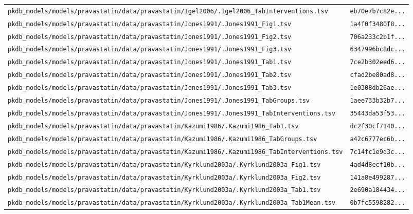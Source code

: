 \documentclass{article}
\begin{document}
\begin{longtable}{ll}
\texttt{pkdb\_models/models/pravastatin/data/pravastatin/Igel2006/.Igel2006\_TabInterventions.tsv} & \texttt{eb70e7b7c82e...} \\
\texttt{pkdb\_models/models/pravastatin/data/pravastatin/Jones1991/.Jones1991\_Fig1.tsv} & \texttt{1a4f0f3480f8...} \\
\texttt{pkdb\_models/models/pravastatin/data/pravastatin/Jones1991/.Jones1991\_Fig2.tsv} & \texttt{706a233c2b1f...} \\
\texttt{pkdb\_models/models/pravastatin/data/pravastatin/Jones1991/.Jones1991\_Fig3.tsv} & \texttt{6347996bc8dc...} \\
\texttt{pkdb\_models/models/pravastatin/data/pravastatin/Jones1991/.Jones1991\_Tab1.tsv} & \texttt{7ce2b302eed6...} \\
\texttt{pkdb\_models/models/pravastatin/data/pravastatin/Jones1991/.Jones1991\_Tab2.tsv} & \texttt{cfad2be80ad8...} \\
\texttt{pkdb\_models/models/pravastatin/data/pravastatin/Jones1991/.Jones1991\_Tab3.tsv} & \texttt{1e0308db26ae...} \\
\texttt{pkdb\_models/models/pravastatin/data/pravastatin/Jones1991/.Jones1991\_TabGroups.tsv} & \texttt{1aee733b32b7...} \\
\texttt{pkdb\_models/models/pravastatin/data/pravastatin/Jones1991/.Jones1991\_TabInterventions.tsv} & \texttt{35443da53f53...} \\
\texttt{pkdb\_models/models/pravastatin/data/pravastatin/Kazumi1986/.Kazumi1986\_Tab1.tsv} & \texttt{dc2f30cf7140...} \\
\texttt{pkdb\_models/models/pravastatin/data/pravastatin/Kazumi1986/.Kazumi1986\_TabGroups.tsv} & \texttt{a42c6777ec6b...} \\
\texttt{pkdb\_models/models/pravastatin/data/pravastatin/Kazumi1986/.Kazumi1986\_TabInterventions.tsv} & \texttt{7c14fc1e9d3c...} \\
\texttt{pkdb\_models/models/pravastatin/data/pravastatin/Kyrklund2003a/.Kyrklund2003a\_Fig1.tsv} & \texttt{4ad4d8ecf10b...} \\
\texttt{pkdb\_models/models/pravastatin/data/pravastatin/Kyrklund2003a/.Kyrklund2003a\_Fig2.tsv} & \texttt{141a8e499287...} \\
\texttt{pkdb\_models/models/pravastatin/data/pravastatin/Kyrklund2003a/.Kyrklund2003a\_Tab1.tsv} & \texttt{2e690a184434...} \\
\texttt{pkdb\_models/models/pravastatin/data/pravastatin/Kyrklund2003a/.Kyrklund2003a\_Tab1Mean.tsv} & \texttt{0b7fc5598282...} \\

\end{longtable}
\end{document}
